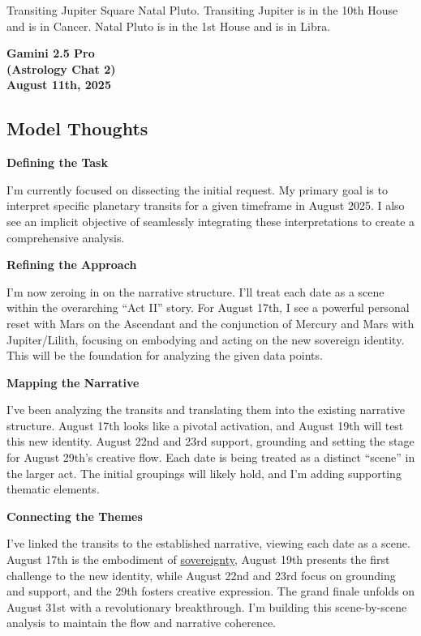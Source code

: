\documentclass{article}
\begin{document}
Transiting Jupiter Square Natal Pluto. Transiting Jupiter is in the 10th House and is in Cancer. Natal Pluto is in the 1st House and is in Libra.

\begin{center}
\textbf{Gamini 2.5 Pro} \\
\textbf{(Astrology Chat 2)} \\
\textbf{August 11th, 2025}
\end{center}

\subsection*{Model Thoughts}\label{model-thoughts}

\textbf{Defining the Task}

I'm currently focused on dissecting the initial request. My primary goal is to interpret specific planetary transits for a given timeframe in August 2025. I also see an implicit objective of seamlessly integrating these interpretations to create a comprehensive analysis.

\textbf{Refining the Approach}

I'm now zeroing in on the narrative structure. I'll treat each date as a scene within the overarching ``Act II'' story. For August 17th, I see a powerful personal reset with Mars on the Ascendant and the conjunction of Mercury and Mars with Jupiter/Lilith, focusing on embodying and acting on the new sovereign identity. This will be the foundation for analyzing the given data points.

\textbf{Mapping the Narrative}

I've been analyzing the transits and translating them into the existing narrative structure. August 17th looks like a pivotal activation, and August 19th will test this new identity. August 22nd and 23rd support, grounding and setting the stage for August 29th's creative flow. Each date is being treated as a distinct ``scene'' in the larger act. The initial groupings will likely hold, and I'm adding supporting thematic elements.

\textbf{Connecting the Themes}

I've linked the transits to the established narrative, viewing each date as a scene. August 17th is the embodiment of \hyperlink{gloss:sovereignty}{sovereignty}, August 19th presents the first challenge to the new identity, while August 22nd and 23rd focus on grounding and support, and the 29th fosters creative expression. The grand finale unfolds on August 31st with a revolutionary breakthrough. I'm building this scene-by-scene analysis to maintain the flow and narrative coherence.
\end{document}
